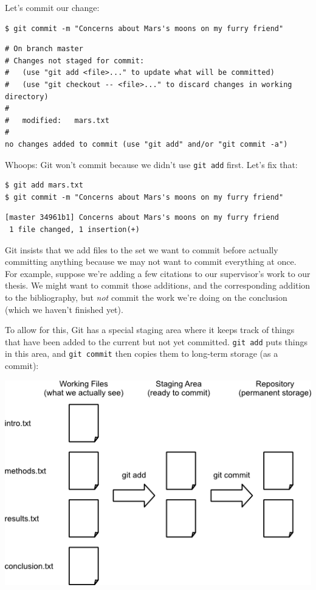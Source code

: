 \documentclass{book}
\begin{document}
Let's commit our change:

\begin{verbatim}
$ git commit -m "Concerns about Mars's moons on my furry friend"
\end{verbatim}

\begin{verbatim}
# On branch master
# Changes not staged for commit:
#   (use "git add <file>..." to update what will be committed)
#   (use "git checkout -- <file>..." to discard changes in working directory)
#
#   modified:   mars.txt
#
no changes added to commit (use "git add" and/or "git commit -a")
\end{verbatim}

Whoops: Git won't commit because we didn't use \texttt{git add} first.
Let's fix that:

\begin{verbatim}
$ git add mars.txt
$ git commit -m "Concerns about Mars's moons on my furry friend"
\end{verbatim}

\begin{verbatim}
[master 34961b1] Concerns about Mars's moons on my furry friend
 1 file changed, 1 insertion(+)
\end{verbatim}

Git insists that we add files to the set we want to commit before
actually committing anything because we may not want to commit
everything at once. For example, suppose we're adding a few citations to
our supervisor's work to our thesis. We might want to commit those
additions, and the corresponding addition to the bibliography, but
\emph{not} commit the work we're doing on the conclusion (which we
haven't finished yet).

To allow for this, Git has a special staging area where it keeps track
of things that have been added to the current
 but not yet committed.
\texttt{git add} puts things in this area, and \texttt{git commit} then
copies them to long-term storage (as a commit):

\includegraphics{novice/git/img/git-staging-area.png}
\end{document}
